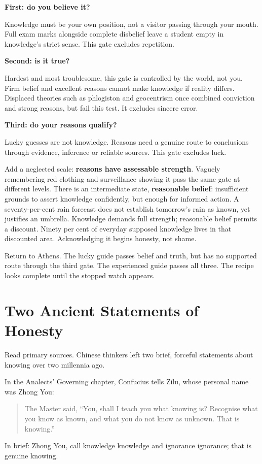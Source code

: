 \textbf{First: do you believe it?}

Knowledge must be your own position, not a visitor passing through your mouth. Full exam marks alongside complete disbelief leave a student empty in knowledge's strict sense. This gate excludes repetition.

\textbf{Second: is it true?}

Hardest and most troublesome, this gate is controlled by the world, not you. Firm belief and excellent reasons cannot make knowledge if reality differs. Displaced theories such as phlogiston and geocentrism once combined conviction and strong reasons, but fail this test. It excludes sincere error.

\textbf{Third: do your reasons qualify?}

Lucky guesses are not knowledge. Reasons need a genuine route to conclusions through evidence, inference or reliable sources. This gate excludes luck.

Add a neglected scale: \textbf{reasons have assessable strength}. Vaguely remembering red clothing and surveillance showing it pass the same gate at different levels. There is an intermediate state, \textbf{reasonable belief}: insufficient grounds to assert knowledge confidently, but enough for informed action. A seventy-per-cent rain forecast does not establish tomorrow's rain as known, yet justifies an umbrella. Knowledge demands full strength; reasonable belief permits a discount. Ninety per cent of everyday supposed knowledge lives in that discounted area. Acknowledging it begins honesty, not shame.

Return to Athens. The lucky guide passes belief and truth, but has no supported route through the third gate. The experienced guide passes all three. The recipe looks complete until the stopped watch appears.

\section{Two Ancient Statements of Honesty}
Read primary sources. Chinese thinkers left two brief, forceful statements about knowing over two millennia ago.

In the Analects' Governing chapter, Confucius tells Zilu, whose personal name was Zhong You:

\begin{quote}
The Master said, ``You, shall I teach you what knowing is? Recognise what you know as known, and what you do not know as unknown. That is knowing.''
\end{quote}
In brief: Zhong You, call knowledge knowledge and ignorance ignorance; that is genuine knowing.

